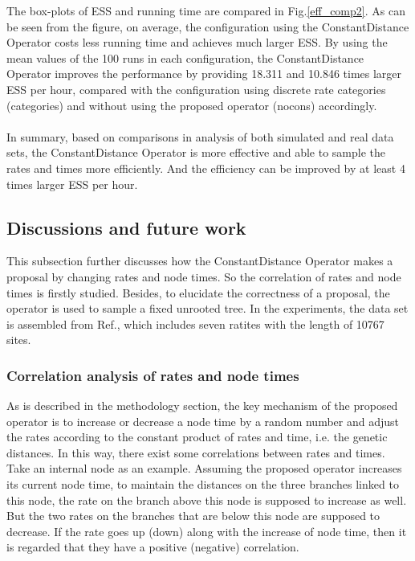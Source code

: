 \documentclass{bmcart}
\begin{document}
The box-plots of ESS and running time are compared in Fig.\ref{eff_comp2}. As can be seen from the figure, on average, the configuration using the ConstantDistance Operator costs less running time and achieves much larger ESS. By using the mean values of the 100 runs in each configuration, the ConstantDistance Operator improves the performance by providing 18.311 and 10.846 times larger ESS per hour, compared with the configuration using discrete rate categories (categories) and without using the proposed operator (nocons) accordingly. 
\\
\\
In summary, based on comparisons in analysis of both simulated and real data sets, the ConstantDistance Operator is more effective and able to sample the rates and times more efficiently. And the efficiency can be improved by at least 4 times larger ESS per hour. 

\subsection*{Discussions and future work}
This subsection further discusses how the ConstantDistance Operator makes a proposal by changing rates and node times. So the correlation of rates and node times is firstly studied. Besides, to elucidate the correctness of a proposal, the operator is used to sample a fixed unrooted tree. In the experiments, the data set is assembled from Ref.\cite{cooper2001complete}, which includes seven ratites with the length of 10767 sites. 
\subsubsection*{Correlation analysis of rates and node times}
As is described in the methodology section, the key mechanism of the proposed operator is to increase or decrease a node time by a random number and adjust the rates according to the constant product of rates and time, i.e. the genetic distances. In this way, there exist some correlations between rates and times. Take an internal node as an example. Assuming the proposed operator increases its current node time, to maintain the distances on the three branches linked to this node, the rate on the branch above this node is supposed to increase as well. But the two rates on the branches that are below this node are supposed to decrease. If the rate goes up (down) along with the increase of node time, then it is regarded that they have a positive (negative) correlation. 
\end{document}
